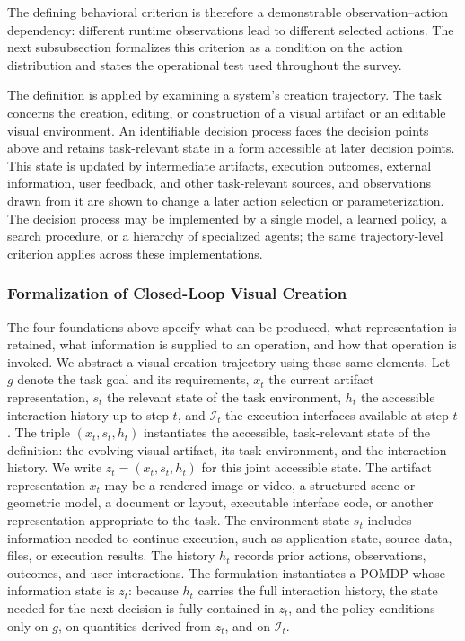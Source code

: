 The defining behavioral criterion is therefore a demonstrable observation--action dependency: different runtime observations lead to different selected actions. The next subsubsection formalizes this criterion as a condition on the action distribution and states the operational test used throughout the survey.

The definition is applied by examining a system's creation trajectory. The task concerns the creation, editing, or construction of a visual artifact or an editable visual environment. An identifiable decision process faces the decision points above and retains task-relevant state in a form accessible at later decision points. This state is updated by intermediate artifacts, execution outcomes, external information, user feedback, and other task-relevant sources, and observations drawn from it are shown to change a later action selection or parameterization. The decision process may be implemented by a single model, a learned policy, a search procedure, or a hierarchy of specialized agents; the same trajectory-level criterion applies across these implementations.

\subsubsection{Formalization of Closed-Loop Visual Creation}

The four foundations above specify what can be produced, what representation is retained, what information is supplied to an operation, and how that operation is invoked. We abstract a visual-creation trajectory using these same elements. Let $g$ denote the task goal and its requirements, $x_t$ the current artifact representation, $s_t$ the relevant state of the task environment, $h_t$ the accessible interaction history up to step $t$, and $\mathcal{I}_t$ the execution interfaces available at step $t$. The triple $(x_t,s_t,h_t)$ instantiates the accessible, task-relevant state of the definition: the evolving visual artifact, its task environment, and the interaction history. We write $z_t=(x_t,s_t,h_t)$ for this joint accessible state. The artifact representation $x_t$ may be a rendered image or video, a structured scene or geometric model, a document or layout, executable interface code, or another representation appropriate to the task. The environment state $s_t$ includes information needed to continue execution, such as application state, source data, files, or execution results. The history $h_t$ records prior actions, observations, outcomes, and user interactions. The formulation instantiates a POMDP whose information state is $z_t$: because $h_t$ carries the full interaction history, the state needed for the next decision is fully contained in $z_t$, and the policy conditions only on $g$, on quantities derived from $z_t$, and on $\mathcal{I}_t$.

